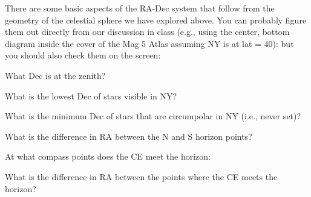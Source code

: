 \documentclass[12pt]{article}
\begin{document}
\newpage
\noindent
There are some basic aspects of the RA-Dec system that follow from the
geometry of the celestial sphere we have explored above. You can
probably figure them out directly from our discussion in class (e.g.,
using the center, bottom diagram inside the cover of the Mag 5 Atlas
assuming NY is at lat = 40\deg): but
you should also check them on the screen: 

\bigskip
\noindent
What Dec is at the zenith?\  \makebox[4cm]{\hrulefill}

\noindent
What is the lowest Dec of stars visible in NY?  \makebox[4cm]{\hrulefill}

\noindent
What is the minimum Dec of stars that are circumpolar in NY (i.e.,
never set)? \makebox[3cm]{\hrulefill}

\noindent
What is the difference in RA between the N and S horizon
points? \makebox[4cm]{\hrulefill}

\noindent
At what compass points does the CE meet the horizon:\makebox[3cm]{\hrulefill}

\noindent
What is the difference in RA between the points where the CE meets the
horizon? \makebox[3cm]{\hrulefill}
\end{document}
